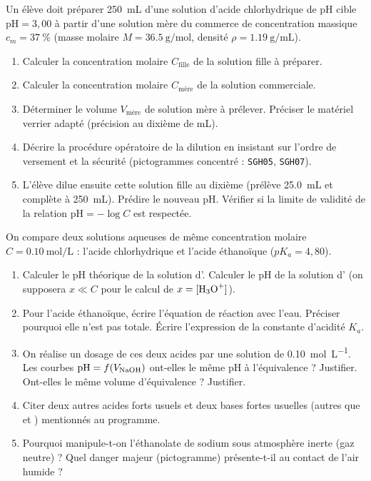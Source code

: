 \documentclass[11pt]{article}
\begin{document}
\begin{exercice}
Un élève doit préparer \SI{250}{\milli\liter} d'une solution d'acide chlorhydrique  de pH cible $\text{pH} = 3,00$ à partir d'une solution mère du commerce de concentration massique $c_m = \SI{37}{\%}$ (masse molaire $M = \SI{36,5}{\gram\per\mol}$, densité $\rho = \SI{1,19}{\gram\per\milli\liter}$).
\begin{enumerate}
    \item Calculer la concentration molaire $C_{\text{fille}}$ de la solution fille à préparer.
    \item Calculer la concentration molaire $C_{\text{mère}}$ de la solution commerciale.
    \item Déterminer le volume $V_{\text{mère}}$ de solution mère à prélever. Préciser le matériel verrier adapté (précision au dixième de mL).
    \item Décrire la procédure opératoire de la dilution en insistant sur l'ordre de versement et la sécurité (pictogrammes  concentré : \texttt{SGH05}, \texttt{SGH07}).
    \item L'élève dilue ensuite cette solution fille au dixième (prélève \SI{25,0}{\milli\liter} et complète à \SI{250}{\milli\liter}). Prédire le nouveau pH. Vérifier si la limite de validité de la relation $\text{pH} = -\log C$ est respectée.
\end{enumerate}
\end{exercice}

\begin{exercice}
On compare deux solutions aqueuses de même concentration molaire $C = \SI{0,10}{\mol\per\liter}$ : l'acide chlorhydrique  et l'acide éthanoïque  ($pK_a = 4,80$). 
\begin{enumerate}
    \item Calculer le pH théorique de la solution d'. Calculer le pH de la solution d' (on supposera $x \ll C$ pour le calcul de $x = [\ce{H3O+}]$).
    \item Pour l'acide éthanoïque, écrire l'équation de réaction avec l'eau. Préciser pourquoi elle n'est pas totale. Écrire l'expression de la constante d'acidité $K_a$.
    \item On réalise un dosage de ces deux acides par une solution de  \SI{0,10}{\mol\per\liter}. Les courbes $\mathrm{pH} = f(V_{\ce{NaOH}})$ ont-elles le même pH à l'équivalence ? Justifier. Ont-elles le même volume d'équivalence ? Justifier.
    \item Citer deux autres acides forts usuels et deux bases fortes usuelles (autres que  et ) mentionnés au programme.
    \item Pourquoi manipule-t-on l'éthanolate de sodium  sous atmosphère inerte (gaz neutre) ? Quel danger majeur (pictogramme) présente-t-il au contact de l'air humide ?
\end{enumerate}
\end{exercice}
\end{document}
